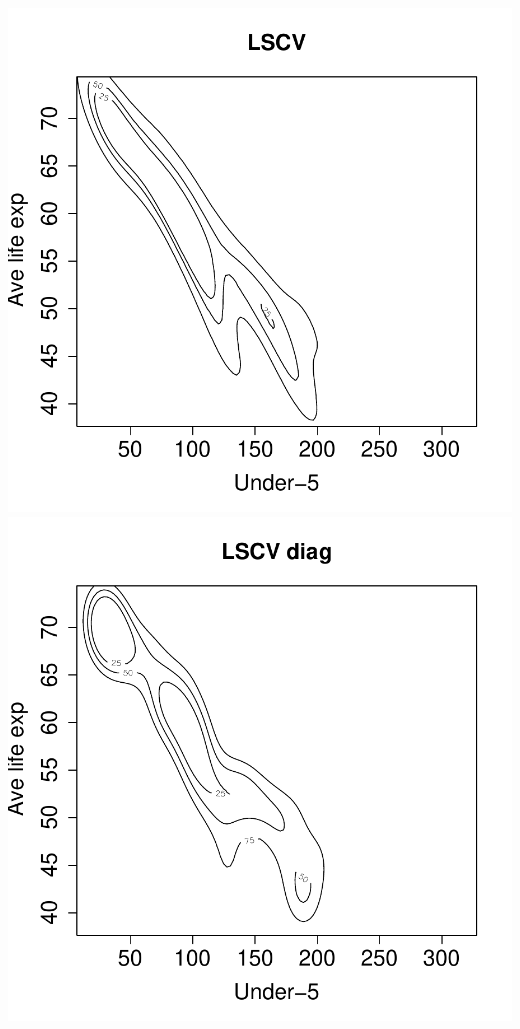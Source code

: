 \documentclass[a4paper,11pt]{article}
\begin{document}
\begin{center}
\includegraphics{kde-014}
\includegraphics{kde-015}

\end{center}
\end{document}
